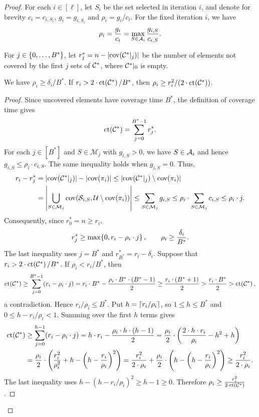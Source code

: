 \begin{proof}
For each $i\in[\ell]$, let $S_i$ be the set selected in iteration $i$, and denote for brevity $c_i=c_{i,S_i}$, $g_i=g_{i,S_i}$ and $\rho_i=g_i/c_i$. For the fixed iteration $i$, we have
\[
    \rho_i=\frac{g_i}{c_i}=\max_{S\in\mathcal{A}_i}\frac{g_{i,S}}{c_{i,S}}.
\]

For $j\in\mathopen{}\left\{ 0,\ldots,B^* \right\}$, let $r_j^*=n-\mathopen{}\left| \operatorname{cov}\mathopen{}\left( \mathcal{C}^{*}|_{j} \right) \right|$ be the number of elements not covered by the first $j$ sets of $\mathcal{C}^{*}$, where $\mathcal{C}^{*}|_{0}$ is empty.
\begin{claim}\label{claim:inforest-pcmssc-density}
We have $\rho_i\geq\delta_i/B^*$. If $r_i>2\cdot\operatorname{ct}\mathopen{}\left( \mathcal{C}^{*} \right)/B^*$, then $\rho_i\geq r_i^2/\mathopen{}\left( 2\cdot\operatorname{ct}\mathopen{}\left( \mathcal{C}^{*} \right) \right)$.
\end{claim}
\begin{proof}
Since uncovered elements have coverage time $B^*$, the definition of coverage time gives
\[
    \operatorname{ct}\mathopen{}\left( \mathcal{C}^{*} \right)=\sum_{j=0}^{B^*-1}r_j^*.
\]
For each $j\in[B^*]$ and $S\in\mathcal{M}_j$ with $g_{i,S}>0$, we have $S\in\mathcal{A}_i$ and hence $g_{i,S}\leq\rho_i\cdot c_{i,S}$. The same inequality holds when $g_{i,S}=0$. Thus,
\begin{align*}
    r_i-r_j^*&=\mathopen{}\left| \operatorname{cov}\mathopen{}\left( \mathcal{C}^{*}|_{j} \right) \right|-\mathopen{}\left| \operatorname{cov}\mathopen{}\left( \pi_i \right) \right|
    \leq\mathopen{}\left| \operatorname{cov}\mathopen{}\left( \mathcal{C}^{*}|_{j} \right)\setminus\operatorname{cov}\mathopen{}\left( \pi_i \right) \right|\\
    &=\mathopen{}\left| \bigcup_{S\in\mathcal{M}_j}\operatorname{cov}\mathopen{}\left( \mathcal{S}_{i,S},\mathcal{U}\setminus\operatorname{cov}\mathopen{}\left( \pi_i \right) \right) \right|
    \leq\sum_{S\in\mathcal{M}_j}g_{i,S}
    \leq\rho_i\cdot\sum_{S\in\mathcal{M}_j}c_{i,S}\leq\rho_i\cdot j.
\end{align*}
Consequently, since $r_0^*=n\geq r_i$,
\[
    r_j^*\geq\max\mathopen{}\left\{ 0,r_i-\rho_i\cdot j \right\},\qquad
    \rho_i\geq\frac{\delta_i}{B^*}.
\]
The last inequality uses $j=B^*$ and $r_{B^*}^*=r_i-\delta_i$.
Suppose that $r_i>2\cdot \operatorname{ct}\mathopen{}\left( \mathcal{C}^{*} \right)/B^*$. If $\rho_i<r_i/B^*$, then
\[
    \operatorname{ct}\mathopen{}\left( \mathcal{C}^{*} \right)\geq\sum_{j=0}^{B^*-1}\mathopen{}\left( r_i-\rho_i\cdot j \right)
    =r_i\cdot B^*-\frac{\rho_i\cdot B^*\cdot(B^*-1)}{2}
    \geq\frac{r_i\cdot(B^*+1)}{2}>\frac{r_i\cdot B^*}{2}>\operatorname{ct}\mathopen{}\left( \mathcal{C}^{*} \right),
\]
a contradiction. Hence $r_i/\rho_i\leq B^*$. Put $h=\mathopen{}\left\lceil r_i/\rho_i \right\rceil$, so $1\leq h\leq B^*$ and $0\leq h-r_i/\rho_i<1$. Summing over the first $h$ terms gives
\begin{align*}
    \operatorname{ct}\mathopen{}\left( \mathcal{C}^{*} \right)&\geq\sum_{j=0}^{h-1}\mathopen{}\left( r_i-\rho_i\cdot j \right)
    =h\cdot r_i-\frac{\rho_i\cdot h\cdot(h-1)}{2}
    =\frac{\rho_i}{2}\cdot\mathopen{}\left( \frac{2\cdot h\cdot r_i}{\rho_i}-h^2+h \right)\\
    &=\frac{\rho_i}{2}\cdot\mathopen{}\left( \frac{r_i^2}{\rho_i^2}+h-\mathopen{}\left( h-\frac{r_i}{\rho_i} \right)^2 \right)
    =\frac{r_i^2}{2\cdot\rho_i}+\frac{\rho_i}{2}\cdot\mathopen{}\left( h-\mathopen{}\left( h-\frac{r_i}{\rho_i} \right)^2 \right)
    \geq\frac{r_i^2}{2\cdot\rho_i}.
\end{align*}
The last inequality uses $h-(h-r_i/\rho_i)^2\geq h-1\geq0$. Therefore $\rho_i\geq\frac{r_i^2}{2\cdot\operatorname{ct}\mathopen{}\left( \mathcal{C}^{*} \right)}$.
\end{proof}


\end{proof}
